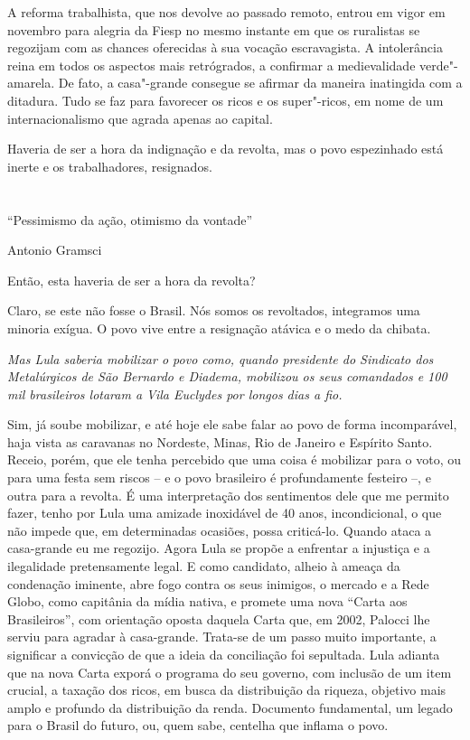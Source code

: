 A reforma trabalhista, que nos devolve ao passado remoto, entrou em
vigor em novembro para alegria da Fiesp no mesmo instante em que os
ruralistas se regozijam com as chances oferecidas à sua vocação
escravagista. A intolerância reina em todos os aspectos mais
retrógrados, a confirmar a medievalidade verde"-amarela. De fato, a
casa"-grande consegue se afirmar da maneira inatingida com a ditadura.
Tudo se faz para favorecer os ricos e os super"-ricos, em nome de um
internacionalismo que agrada apenas ao capital.

Haveria de ser a hora da indignação e da revolta, mas o povo espezinhado
está inerte e os trabalhadores, resignados.



\chapter*{}

\epigraph{``Pessimismo da ação, otimismo da vontade''}{Antonio Gramsci}


\parindent0pt
\parskip\medskipamount

 Então, esta haveria de ser a hora da revolta?

 Claro, se este não fosse o Brasil. Nós somos os
revoltados, integramos uma minoria exígua. O povo vive entre a
resignação atávica e o medo da chibata.

\itshape
 Mas Lula saberia mobilizar o povo como, quando
presidente do Sindicato dos Metalúrgicos de São Bernardo e Diadema,
mobilizou os seus comandados e 100 mil brasileiros lotaram a Vila
Euclydes por longos dias a fio.

\normalfont
Sim, já soube mobilizar, e até hoje ele sabe falar ao
povo de forma incomparável, haja vista as caravanas no Nordeste, Minas,
Rio de Janeiro e Espírito Santo. Receio, porém, que ele tenha percebido
que uma coisa é mobilizar para o voto, ou para uma festa sem riscos -- e
o povo brasileiro é profundamente festeiro --, e outra para a revolta. É
uma interpretação dos sentimentos dele que me permito fazer, tenho por
Lula uma amizade inoxidável de 40 anos, incondicional, o que não impede
que, em determinadas ocasiões, possa criticá-lo. Quando ataca a
casa-grande eu me regozijo. Agora Lula se propõe a enfrentar a injustiça
e a ilegalidade pretensamente legal. E como candidato, alheio à ameaça
da condenação iminente, abre fogo contra os seus inimigos, o mercado e a
Rede Globo, como capitânia da mídia nativa, e promete uma nova ``Carta
aos Brasileiros'', com orientação oposta daquela Carta que, em 2002,
Palocci lhe serviu para agradar à casa-grande. Trata-se de um passo
muito importante, a significar a convicção de que a ideia da conciliação
foi sepultada. Lula adianta que na nova Carta exporá o programa do seu
governo, com inclusão de um item crucial, a taxação dos ricos, em busca
da distribuição da riqueza, objetivo mais amplo e profundo da
distribuição da renda. Documento fundamental, um legado para o Brasil do
futuro, ou, quem sabe, centelha que inflama o povo.

